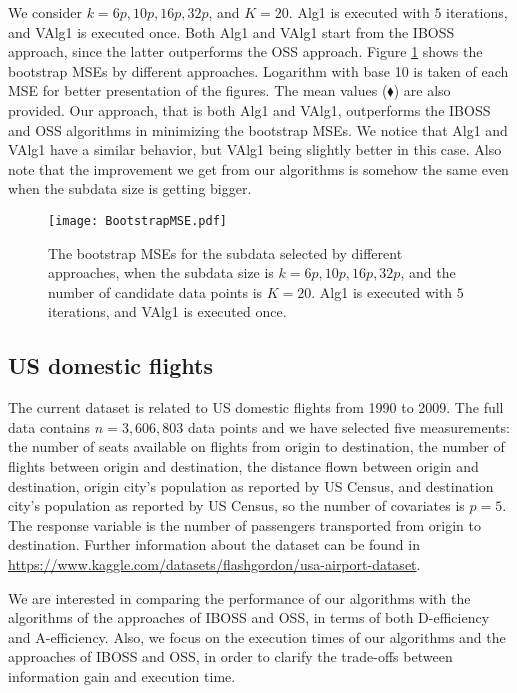 \documentclass[12pt]{article}
\theoremstyle{definition}
\begin{document}
	We consider $k=6p, 10p, 16p, 32p$, and $K=20$. Alg1 is executed with $5$ iterations, and VAlg1 is executed once. Both Alg1 and VAlg1 start from the IBOSS approach, since the latter outperforms the OSS approach. Figure \ref{protein} shows the bootstrap MSEs by different approaches. Logarithm with base 10 is taken of each MSE for better presentation of the figures. The mean values ($\blacklozenge$) are also provided. Our approach, that is both Alg1 and VAlg1, outperforms the  IBOSS and OSS algorithms in minimizing the bootstrap MSEs. We notice that Alg1 and VAlg1 have a similar behavior, but VAlg1 being slightly better in this case. Also note that the improvement we get from our algorithms is somehow the same even when the subdata size is getting bigger.
	
	\begin{figure}[!thb]
		\centering
		\texttt{[image: BootstrapMSE.pdf]}
		\caption{The bootstrap MSEs for the subdata selected by different approaches, when the subdata size is $k=6p, 10p, 16p, 32p$, and the number of candidate data points is $K=20$. Alg1 is executed with $5$ iterations, and VAlg1 is executed once.}
		\label{protein}
	\end{figure}
	
	\subsection{US domestic flights}
	The current dataset is related to US domestic flights from 1990 to 2009. The full data contains $n=3, 606, 803$ data points and we have selected five measurements: the number of seats available on flights from origin to destination, the number of flights between origin and destination, the distance flown between origin and destination, origin city's population as reported by US Census, and destination city's population as reported by US Census, so the number of covariates is $p=5$. The response variable is the number of passengers transported from origin to destination. Further information about the dataset can be found in \url{https://www.kaggle.com/datasets/flashgordon/usa-airport-dataset}.
	
	We are interested in comparing the performance of our algorithms with the algorithms of the approaches of IBOSS and OSS, in terms of both D-efficiency and A-efficiency. Also, we focus on the execution times of our algorithms and the approaches of IBOSS and OSS, in order to clarify the trade-offs between information gain and execution time. 
	
\end{document}
